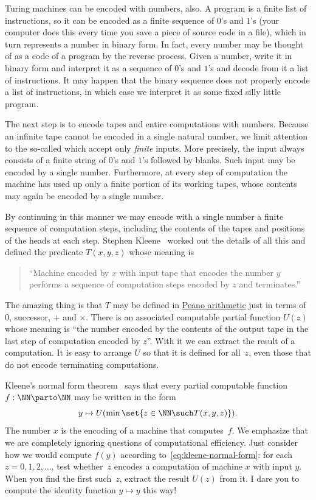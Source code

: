 Turing machines can be encoded with numbers, also. A program is a finite
list of instructions, so it can be encoded as a finite sequence of
$0$'s and $1$'s (your computer does this every time you save a piece of
source code in a file), which in turn represents a number in binary
form. In fact, every number may be thought of as a code of a program
by the reverse process. Given a number, write it in binary form and
interpret it as a sequence of $0$'s and $1$'s and decode from it a
list of instructions. It may happen that the binary sequence does not
properly encode a list of instructions, in which case we interpret it
as some fixed silly little program.

The next step is to encode tapes and entire computations with numbers.
Because an infinite tape cannot be encoded in a single natural number,
we limit attention to the so-called  which
accept only \emph{finite} inputs. More precisely, the input always
consists of a finite string of $0$'s and $1$'s followed by blanks.
Such input may be encoded by a single number. Furthermore, at every
step of computation the machine has used up only a finite portion of
its working tapes, whose contents may again be encoded by a single number.

By continuing in this manner we may encode with a single number a finite
sequence of computation steps, including the contents of the tapes
and positions of the heads at each step. Stephen Kleene~
worked out the details of all this and defined the predicate
$T(x,y,z)$ whose meaning is
%
\begin{quote}
  ``Machine encoded by $x$ with input tape that encodes the number $y$
  performs a sequence of computation steps encoded by $z$ and
  terminates.''
\end{quote}
%
The amazing thing is that $T$ may be defined in \href{https://en.wikipedia.org/wiki/Peano_axioms#Peano_arithmetic_as_first-order_theory}{Peano arithmetic} just
in terms of $0$, successor, $+$ and $\times$. There is an
associated computable partial function $U(z)$ whose meaning is ``the
number encoded by the contents of the output tape in the last step of
computation encoded by $z$''. With it we can extract the result of a computation. It is easy to arrange $U$ so that it is defined for all~$z$, even those that do not encode terminating computations.

Kleene's normal form theorem~
says that every partial computable function $f : \NN \parto \NN$ may
be written in the form
%
\begin{equation}
  \label{eq:kleene-normal-form}
  y \mapsto U(\min \set{z \in \NN \such T(x,y,z)}).
\end{equation}
%
The number $x$ is the encoding of a machine that computes~$f$. We
emphasize that we are completely ignoring questions of computational
efficiency. Just consider how we would compute $f(y)$ according
to~\eqref{eq:kleene-normal-form}: for each $z = 0, 1, 2, \ldots$, test
whether~$z$ encodes a computation of machine $x$ with input $y$. When
you find the first such~$z$, extract the result $U(z)$ from it. I dare
you to compute the identity function $y \mapsto y$ this way!

